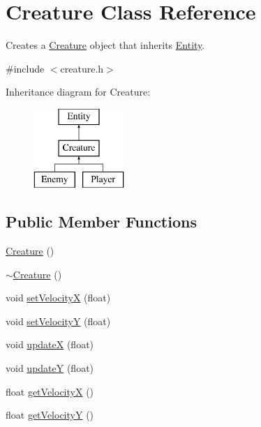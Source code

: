 \hypertarget{class_creature}{\section{Creature Class Reference}
\label{class_creature}
}


Creates a \hyperlink{class_creature}{Creature} object that inherits \hyperlink{class_entity}{Entity}.  




{\ttfamily \#include $<$creature.\+h$>$}

Inheritance diagram for Creature\+:\begin{figure}[H]
\begin{center}
\leavevmode
\includegraphics[height=3.000000cm]{class_creature}
\end{center}
\end{figure}
\subsection*{Public Member Functions}
\begin{DoxyCompactItemize}
\item 
\hyperlink{class_creature_a597cc3b08ee17de46c3e7ec3cf0d9b58}{Creature} ()
\item 
\hyperlink{class_creature_aa991b23f4813fbdb6f875204ed49814d}{$\sim$\+Creature} ()
\item 
void \hyperlink{class_creature_ab2ad7544f3c7fd24829c8c28ea5c667f}{set\+Velocity\+X} (float)
\item 
void \hyperlink{class_creature_a5aa971df9bf484d62fbe6413f01a661b}{set\+Velocity\+Y} (float)
\item 
void \hyperlink{class_creature_ac10e36c59bd7ec83708b46235aefbc33}{update\+X} (float)
\item 
void \hyperlink{class_creature_ab2bdf6ddfe183c828761bae1da81be47}{update\+Y} (float)
\item 
float \hyperlink{class_creature_a405b16c27bc5617e9c37ac01e166c785}{get\+Velocity\+X} ()
\item 
float \hyperlink{class_creature_a0ca2c7cccf8c8182dcad7a3b6737380b}{get\+Velocity\+Y} ()
\end{DoxyCompactItemize}
